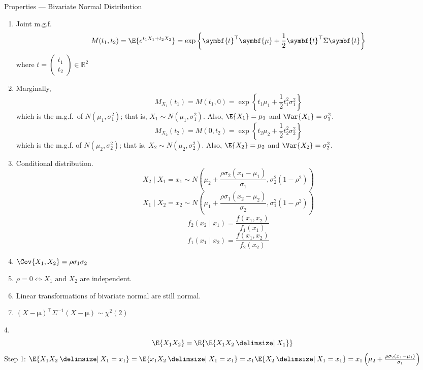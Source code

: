 \begin{Proposition}{Properties --- Bivariate Normal Distribution}{}
    \begin{enumerate}[label=(\arabic*)]
        \item Joint m.g.f.
              \[ M(t_1,t_2)=\E{
                      e^{t_1X_1+t_2X_2}
                  }=\exp\left\{ \symbf{t}^\top \symbf{\mu}+\frac{1}{2}\symbf{t}^\top \Sigma
                  \symbf{t} \right\} \]
              where $ t=\begin{pmatrix}
                      t_1 \\
                      t_2
                  \end{pmatrix}\in\mathbb{R}^2 $
        \item Marginally,
              \[ M_{X_1}(t_1)=M(t_1,0)=\exp\left\{ t_1\mu_1+\frac{1}{2} t_1^2
                  \sigma_1^2\right\} \]
              which is the m.g.f.\ of $ N(\mu_1,\sigma_1^2) $; that is,
              $ X_1 \sim N(\mu_1,\sigma_1^2) $. Also,
              $ \E{X_1}=\mu_1 $ and $ \Var{X_1}=\sigma_1^2 $.
              \[ M_{X_2}(t_2)=M(0,t_2)=\exp\left\{ t_2\mu_2+\frac{1}{2} t_2^2
                  \sigma_2^2\right\} \]
              which is the m.g.f. of $ N(\mu_2,\sigma_2^2) $; that is,
              $ X_2 \sim N(\mu_2,\sigma_2^2) $. Also,
              $ \E{X_2}=\mu_2 $ and $ \Var{X_2}=\sigma_2^2 $.
        \item Conditional distribution.
              \[ X_2\mid X_1=x_1 \sim N
                  \left( \mu_2+\frac{\rho\sigma_2(x_1-\mu_1)}{\sigma_1} ,
                  \sigma_2^2(1-\rho^2) \right) \]
              \[ X_1\mid X_2=x_2 \sim N
                  \left( \mu_1+\frac{\rho\sigma_1(x_2-\mu_2)}{\sigma_2} ,
                  \sigma_1^2(1-\rho^2) \right) \]
              \[ f_2(x_2\mid x_1)=\frac{f(x_1,x_2)}{f_1(x_1)}  \]
              \[ f_1(x_1\mid x_2)=\frac{f(x_1,x_2)}{f_2(x_2)}  \]
        \item $ \Cov{X_1,X_2}=\rho\sigma_1\sigma_2 $
        \item $ \rho=0\iff X_1\text{ and }X_2 $ are independent.
        \item Linear transformations of bivariate
              normal are still normal.
        \item $ (X-\symbf{\mu})^\top \Sigma^{-1}(X-\symbf{\mu})\sim \chi^2(2) $
    \end{enumerate}
\end{Proposition}

4. \[ \E{X_1X_2}=\E{\E{X_1X_2\given X_1}} \]
Step 1: $ \E{X_1X_2\given X_1=x_1}=\E{x_1X_2\given X_1=x_1}=
    x_1\E{X_2\given X_1=x_1}=x_1
    \left(  \mu_2+\frac{\rho\sigma_2(x_1-\mu_1)}{\sigma_1} \right) $

